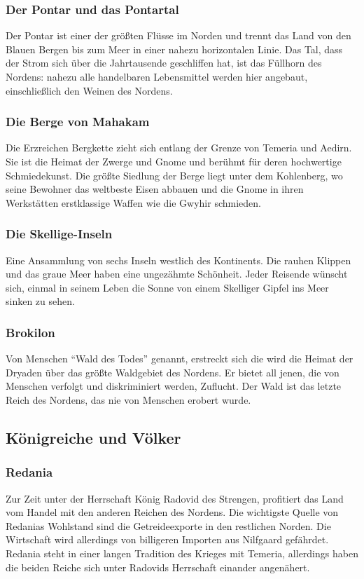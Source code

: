 \documentclass[parskip=full,11pt]{scrreport}
\begin{document}
	\subsubsection{Der Pontar und das Pontartal}
	Der Pontar ist einer der größten Flüsse im Norden und trennt das Land von den Blauen Bergen bis zum Meer in einer nahezu horizontalen Linie. Das Tal, dass der Strom sich über die Jahrtausende geschliffen hat, ist das Füllhorn des Nordens: nahezu alle handelbaren Lebensmittel werden hier angebaut, einschließlich den Weinen des Nordens.

	\subsubsection{Die Berge von Mahakam}
	Die Erzreichen Bergkette zieht sich entlang der Grenze von Temeria und Aedirn. Sie ist die Heimat der Zwerge und Gnome und berühmt für deren hochwertige Schmiedekunst. Die größte Siedlung der Berge liegt unter dem Kohlenberg, wo seine Bewohner das weltbeste Eisen abbauen und die Gnome in ihren Werkstätten erstklassige Waffen wie die Gwyhir schmieden.

	\subsubsection{Die Skellige-Inseln}
	Eine Ansammlung von sechs Inseln westlich des Kontinents. Die rauhen Klippen und das graue Meer haben eine ungezähmte Schönheit. Jeder Reisende wünscht sich, einmal in seinem Leben die Sonne von einem Skelliger Gipfel ins Meer sinken zu sehen.

	\subsubsection{Brokilon}
	Von Menschen ``Wald des Todes'' genannt, erstreckt sich die wird die Heimat der Dryaden über das größte Waldgebiet des Nordens. Er bietet all jenen, die von Menschen verfolgt und diskriminiert werden, Zuflucht. Der Wald ist das letzte Reich des Nordens, das nie von Menschen erobert wurde.

	\subsection{Königreiche und Völker}
	\subsubsection{Redania}
	Zur Zeit unter der Herrschaft König Radovid des Strengen, profitiert das Land vom Handel mit den anderen Reichen des Nordens. Die wichtigste Quelle von Redanias Wohlstand sind die Getreideexporte in den restlichen Norden. Die Wirtschaft wird allerdings von billigeren Importen aus Nilfgaard gefährdet. Redania steht in einer langen Tradition des Krieges mit Temeria, allerdings haben die beiden Reiche sich unter Radovids Herrschaft einander angenähert.
\end{document}
